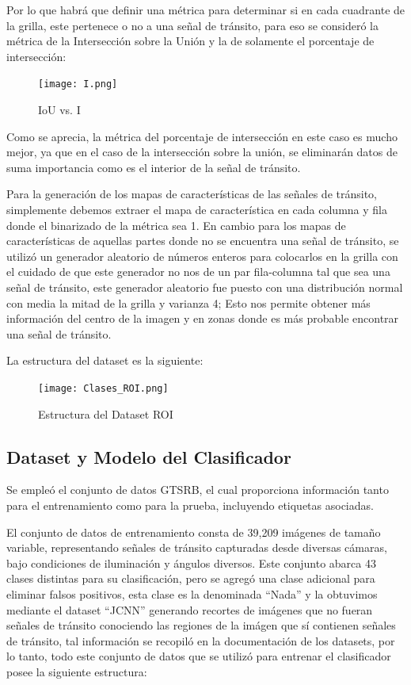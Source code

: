     Por lo que habrá que definir una métrica para determinar si en cada cuadrante de la grilla, este pertenece o no a una señal de tránsito, para eso se consideró la métrica de la Intersección sobre la Unión y la de solamente el porcentaje de intersección:
    
    \begin{figure}[ht]
        \centering
        \texttt{[image: I.png]}
        \caption{IoU vs. I}
    \end{figure}

    Como se aprecia, la métrica del porcentaje de intersección en este caso es mucho mejor, ya que en el caso de la intersección sobre la unión, se eliminarán datos de suma importancia como es el interior de la señal de tránsito.

    Para la generación de los mapas de características de las señales de tránsito, simplemente debemos extraer el mapa de característica en cada columna y fila donde el binarizado de la métrica sea 1. En cambio para los mapas de características de aquellas partes donde no se encuentra una señal de tránsito, se utilizó un generador aleatorio de números enteros para colocarlos en la grilla con el cuidado de que este generador no nos de un par fila-columna tal que sea una señal de tránsito, este generador aleatorio fue puesto con una distribución normal con media la mitad de la grilla y varianza 4; Esto nos permite obtener más información del centro de la imagen y en zonas donde es más probable encontrar una señal de tránsito.

    La estructura del dataset es la siguiente:
    
    \begin{figure}[ht]
        \centering
        \texttt{[image: Clases\_ROI.png]}
        \caption{Estructura del Dataset ROI}
    \end{figure}


    \subsection{Dataset y Modelo del Clasificador}
    Se empleó el conjunto de datos GTSRB, el cual proporciona información tanto para el entrenamiento como para la prueba, incluyendo etiquetas asociadas.

    El conjunto de datos de entrenamiento consta de 39,209 imágenes de tamaño variable, representando señales de tránsito capturadas desde diversas cámaras, bajo condiciones de iluminación y ángulos diversos. 
    Este conjunto abarca 43 clases distintas para su clasificación, pero se agregó una clase adicional para eliminar falsos positivos, esta clase es la denominada ``Nada'' y la obtuvimos mediante el dataset ``JCNN'' generando recortes de imágenes que no fueran señales de tránsito conociendo las regiones de la imágen que sí contienen señales de tránsito, tal información se recopiló en la documentación de los datasets, por lo tanto, todo este conjunto de datos que se utilizó para entrenar el clasificador posee la siguiente estructura:
    
